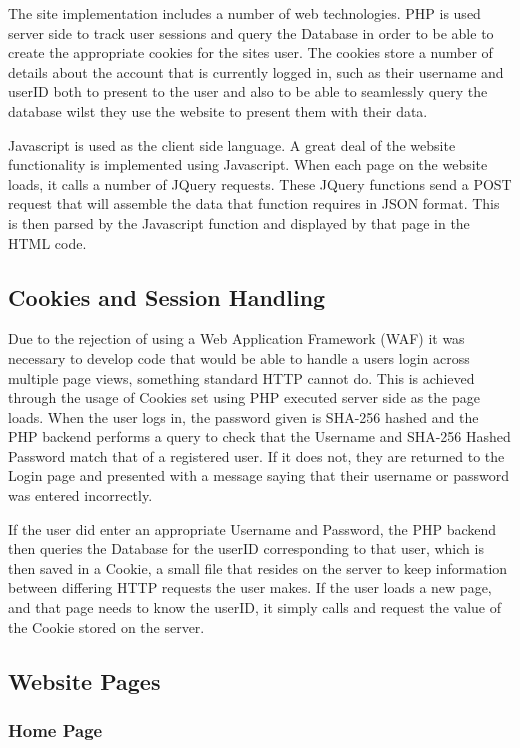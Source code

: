 \documentclass{l4proj}
\begin{document}
The site implementation includes a number of web technologies. PHP is used server side to track user sessions and query the Database in order to be able to create the appropriate cookies for the sites user. The cookies store a number of details about the account that is currently logged in, such as their username and userID both to present to the user and also to be able to seamlessly query the database wilst they use the website to present them with their data.

Javascript is used as the client side language. A great deal of the website functionality is implemented using Javascript. When each page on the website loads, it calls a number of JQuery requests. These JQuery functions send a POST request that will assemble the data that function requires in JSON format. This is then parsed by the Javascript function and displayed by that page in the HTML code.

\subsection{Cookies and Session Handling}

Due to the rejection of using a Web Application Framework (WAF) it was necessary to develop code that would be able to handle a users login across multiple page views, something standard HTTP cannot do. This is achieved through the usage of Cookies set using PHP executed server side as the page loads. When the user logs in, the password given is SHA-256 hashed and the PHP backend performs a query to check that the Username and SHA-256 Hashed Password match that of a registered user. If it does not, they are returned to the Login page and presented with a message saying that their username or password was entered incorrectly. 

If the user did enter an appropriate Username and Password, the PHP backend then queries the Database for the userID corresponding to that user, which is then saved in a Cookie, a small file that resides on the server to keep information between differing HTTP requests the user makes. If the user loads a new page, and that page needs to know the userID, it simply calls and request the value of the Cookie stored on the server.

\subsection{Website Pages}

\subsubsection{Home Page}
\end{document}
